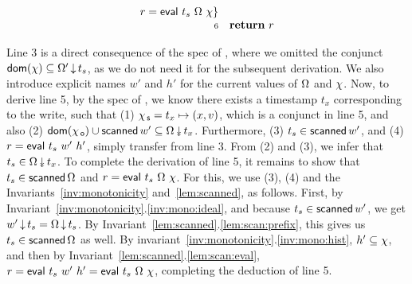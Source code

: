 {\[\begin{array}{r l}
{%
               r = \eval\ t_s\ \stableorder\ \hist\}}\\
 \num{6} & \kw{return}\ r
\end{array}
\]}

Line 3 is a direct consequence of the spec of \jyscan, where we
omitted the conjunct $\mathsf{dom}(\chi) \subseteq
\Omega'\,{\downarrow}\,t_s$, as we do not need it for the subsequent
derivation. We also introduce explicit names $w'$ and $h'$ for the
current values of $\Omega$ and $\chi$.
%
Now, to derive line 5, by the spec of \jywrite, we know there exists a
timestamp $t_x$ corresponding to the write, such that (1) $\chi_{\, \mathsf{s}} =
t_x \mapsto (x, v)$, which is a conjunct in line 5, and also (2)
$\dom{\histO} \cup \scanned{w'} \subseteq
\sideal{\stableorder}{t_x}$. Furthermore, (3) $t_s \in \mathsf{scanned}\,w'$,
and (4) $r = \mathsf{eval}\ t_s\ w'\ h'$, simply transfer from line 3. From
(2) and (3), we infer that $t_s \in \sideal{\stableorder}{t_x}$. To
complete the derivation of line 5, it remains to show that $t_s \in
\mathsf{scanned}\,\Omega$ and $r = \mathsf{eval}\ t_s\ \Omega\ \chi$. For
this, we use (3), (4) and the Invariants~\ref{inv:monotonicity}
and~\ref{lem:scanned}, as follows.  First, by
Invariant~\ref{inv:monotonicity}.\ref{inv:mono:ideal}, and because
$t_s \in \mathsf{scanned}\,w'$, we get $w'\,{\downarrow}\,t_s =
\Omega\,{\downarrow}\,t_s$. By
Invariant~\ref{lem:scanned}.\ref{lem:scan:prefix}, this gives us $t_s
\in \mathsf{scanned}\,\Omega$ as well.  By
invariant~\ref{inv:monotonicity}.\ref{inv:mono:hist}, $h' \subseteq
\chi$, and then by Invariant~\ref{lem:scanned}.\ref{lem:scan:eval},
$r = \mathsf{eval}\ t_s\ w'\ h' = \mathsf{eval}\ t_s\ \Omega\ \chi$, completing
the deduction of line 5.  

